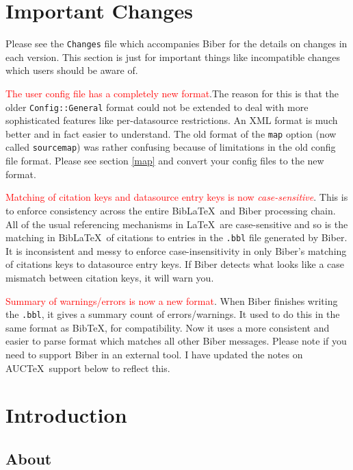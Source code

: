 \documentclass{ltxdockit}
\begin{document}
\printtitlepage
\tableofcontents

\section{Important Changes}\label{special}

Please see the \verb+Changes+ file which accompanies Biber for the
details on changes in each version. This section is just for important
things like incompatible changes which users should be aware of.

\textcolor{red}{The user config file has a completely new format}.The
  reason for this is that the older \verb+Config::General+ format
  could not be extended to deal with more sophisticated features like
  per-datasource restrictions. An XML format is much better and in
  fact easier to understand. The old format of the \verb+map+ option
  (now called \verb+sourcemap+) was rather confusing because
  of limitations in the old config file format. Please see section
  \ref{map} and convert your config files to the new format.

\textcolor{red}{Matching of citation keys and datasource entry keys is now
  \emph{case-sensitive}}. This is to enforce consistency across the entire
Bib\LaTeX\ and Biber processing chain. All of the usual referencing
mechanisms in \LaTeX\ are case-sensitive and so is the matching in
Bib\LaTeX\ of citations to entries in the \texttt{.bbl} file generated by
Biber. It is inconsistent and messy to enforce case-insensitivity in only
Biber's matching of citations keys to datasource entry keys. If Biber
detects what looks like a case mismatch between citation keys, it will warn
you.

\noindent \textcolor{red}{Summary of warnings/errors is now a new format}.
When Biber finishes writing the \verb+.bbl+, it gives a summary
count of errors/warnings. It used to do this in the same format as
Bib\TeX, for compatibility. Now it uses a more consistent and easier
to parse format which matches all other Biber messages. Please note
if you need to support Biber in an external tool. I have updated the
notes on AUC\TeX\ support below to reflect this.

\section{Introduction}\label{int}

\subsection{About}
\end{document}

